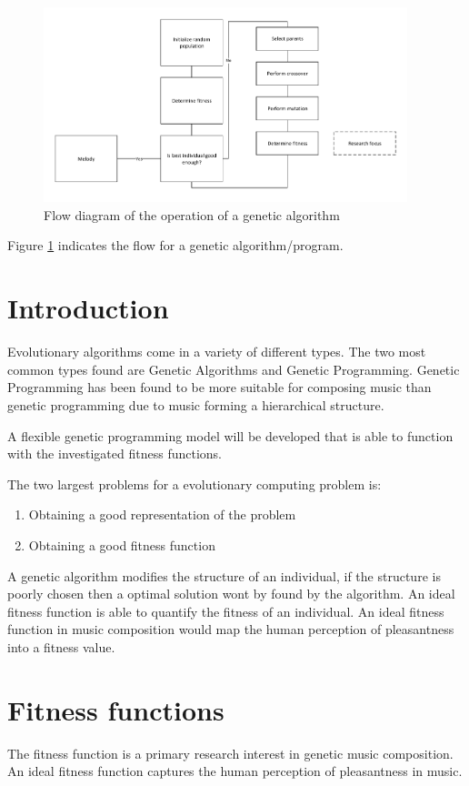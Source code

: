 \begin{figure}
\centerline{\includegraphics[width=400px]{../images/GA_flow.pdf}}
\caption{Flow diagram of the operation of a genetic algorithm}
\label{ims:geneticflow}
\end{figure}

Figure \ref{ims:geneticflow} indicates the flow for a genetic algorithm/program.

\section{Introduction}

Evolutionary algorithms come in a variety of different types. The two most common types found are Genetic Algorithms and Genetic Programming. Genetic Programming has been found to be more suitable for composing music than genetic programming due to music forming a hierarchical structure.

A flexible genetic programming model will be developed that is able to function with the investigated fitness functions. 

The two largest problems for a evolutionary computing problem is:
\begin{enumerate}
\item Obtaining a good representation of the problem
\item Obtaining a good fitness function
\end{enumerate}
A genetic algorithm modifies the structure of an individual, if the structure is poorly chosen then a optimal solution wont by found by the algorithm.
An ideal fitness function is able to quantify the fitness of an individual. An ideal fitness function in music composition would map the human perception of pleasantness into a fitness value. 

\section{Fitness functions}
The fitness function is a primary research interest in genetic music composition. An ideal fitness function captures the human perception of pleasantness in music.

